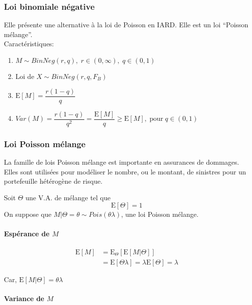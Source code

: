 \subsubsection{Loi binomiale négative}\label{loi-binomiale-negative}

Elle présente une alternative à la loi de Poisson en IARD. Elle est un
loi ``Poisson mélange''.\\
Caractéristiques:

\begin{enumerate}
\item $M \sim BinNeg(r,q),\;r \in (0,\infty),\; q\in (0,1)$
\item Loi de $X \sim BinNeg(r,q,F_B)$
\item $\text{E}[M]=\dfrac{r(1-q)}{q}$
\item $Var(M)=\dfrac{r(1-q)}{q^2}=\dfrac{\text{E}[M]}{q} \geq \text{E}[M],\; \text{pour}\; q\in(0,1)$
\end{enumerate}

\subsubsection{Loi Poisson mélange}\label{loi-poisson-melange}

La famille de lois Poisson mélange est importante en assurances de
dommages. Elles sont utilisées pour modéliser le nombre, ou le montant,
de sinistres pour un portefeuille hétérogène de risque.

Soit \(\Theta\) une V.A. de mélange tel que\\
\[\text{E}[\Theta]=1\] On suppose que
\(M|\Theta=\theta \sim Pois(\theta \lambda)\), une loi Poisson mélange.

\paragraph*{Espérance de \(M\)}\label{esperance-de-m}

\begin{align*}
\text{E}[M]& =\text{E}_{\Theta}\left [\text{E}[M|\Theta]\right ]\\
& =\text{E}[\Theta \lambda] = \lambda\text{E}[\Theta]=\lambda
\end{align*}

Car, \(\text{E}[M|\Theta]=\theta\lambda\)

\paragraph*{Variance de \(M\)}\label{variance-de-m}

